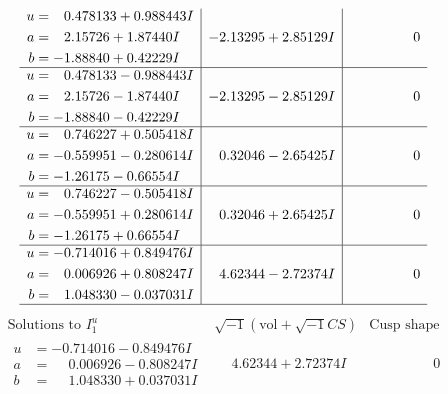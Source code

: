 \documentclass[1p]{elsarticle_modified}
\theoremstyle{definition}
\newcommand{\I}{\sqrt{-1}}
\begin{document}
$$\begin{array}{c|c|c}
\begin{aligned}
u &= \phantom{-}0.478133 + 0.988443 I \\
a &= \phantom{-}2.15726 + 1.87440 I \\
b &= -1.88840 + 0.42229 I\end{aligned}
 & -2.13295 + 2.85129 I & \phantom{-0.000000 } 0 \\ \hline\begin{aligned}
u &= \phantom{-}0.478133 - 0.988443 I \\
a &= \phantom{-}2.15726 - 1.87440 I \\
b &= -1.88840 - 0.42229 I\end{aligned}
 & -2.13295 - 2.85129 I & \phantom{-0.000000 } 0 \\ \hline\begin{aligned}
u &= \phantom{-}0.746227 + 0.505418 I \\
a &= -0.559951 - 0.280614 I \\
b &= -1.26175 - 0.66554 I\end{aligned}
 & \phantom{-}0.32046 - 2.65425 I & \phantom{-0.000000 } 0 \\ \hline\begin{aligned}
u &= \phantom{-}0.746227 - 0.505418 I \\
a &= -0.559951 + 0.280614 I \\
b &= -1.26175 + 0.66554 I\end{aligned}
 & \phantom{-}0.32046 + 2.65425 I & \phantom{-0.000000 } 0 \\ \hline\begin{aligned}
u &= -0.714016 + 0.849476 I \\
a &= \phantom{-}0.006926 + 0.808247 I \\
b &= \phantom{-}1.048330 - 0.037031 I\end{aligned}
 & \phantom{-}4.62344 - 2.72374 I & \phantom{-0.000000 } 0\\
 \hline 
 \end{array}$$\newpage$$\begin{array}{c|c|c}  
\text{Solutions to }I^u_{1}& \I (\text{vol} + \sqrt{-1}CS) & \text{Cusp shape}\\
 \hline 
\begin{aligned}
u &= -0.714016 - 0.849476 I \\
a &= \phantom{-}0.006926 - 0.808247 I \\
b &= \phantom{-}1.048330 + 0.037031 I\end{aligned}
 & \phantom{-}4.62344 + 2.72374 I & \phantom{-0.000000 } 0 \\ \hline\begin{aligned}

\end{aligned}
\end{array}$$
\end{document}

